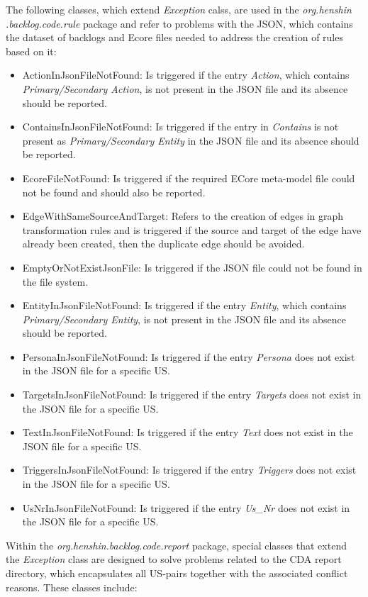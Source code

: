 The following classes, which extend \textit{Exception} calss, are used in the \textit{org.henshin .backlog.code.rule} package and refer to problems with the JSON, which contains the dataset of backlogs and Ecore files needed to address the creation of rules based on it:
\begin{itemize}
	\item ActionInJsonFileNotFound: Is triggered if the entry \textit{Action}, which contains \textit{Primary/Secondary Action}, is not present in the JSON file and its absence should be reported.
	\item ContainsInJsonFileNotFound: Is triggered if the entry in \textit{Contains} is not present as \textit{Primary/Secondary Entity} in the JSON file and its absence should be reported.
	\item EcoreFileNotFound: Is triggered if the required ECore meta-model file could not be found and should also be reported.
	\item EdgeWithSameSourceAndTarget: Refers to the creation of edges in graph transformation rules and is triggered if the source and target of the edge have already been created, then the duplicate edge should be avoided.
	\item EmptyOrNotExistJsonFile: Is triggered if the JSON file could not be found in the file system.
	\item EntityInJsonFileNotFound: Is triggered if the entry \textit{Entity}, which contains \textit{Primary/Secondary Entity}, is not present in the JSON file and its absence should be reported.
	\item PersonaInJsonFileNotFound: Is triggered if the entry \textit{Persona} does not exist in the JSON file for a specific US.
	\item TargetsInJsonFileNotFound: Is triggered if the entry \textit{Targets} does not exist in the JSON file for a specific US.
	\item TextInJsonFileNotFound: Is triggered if the entry \textit{Text} does not exist in the JSON file for a specific US. 
	\item TriggersInJsonFileNotFound: Is triggered if the entry \textit{Triggers} does not exist in the JSON file for a specific US. 
	\item UsNrInJsonFileNotFound: Is triggered if the entry \textit{Us\_Nr} does not exist in the JSON file for a specific US.
\end{itemize}
Within the \textit{org.henshin.backlog.code.report} package, special classes that extend the \textit{Exception} class are designed to solve problems related to the CDA report directory, which encapsulates all US-pairs together with the associated conflict reasons. These classes include:
